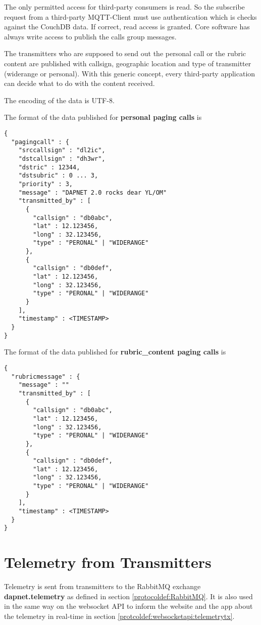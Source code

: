 The only permitted access for third-party consumers is read. So the subscribe request from a third-party MQTT-Client must use authentication which is checks against the CouchDB data. If correct, read access is granted. Core software has always write access to publish the calls group messages.

The transmitters who are supposed to send out the personal call or the rubric content are published with callsign, geographic location and type of transmitter (widerange or personal). With this generic concept, every third-party application can decide what to do with the content received.

The encoding of the data is UTF-8.

The format of the data published for \textbf{personal paging calls} is
\begin{lstlisting}
{
  "pagingcall" : {
    "srccallsign" : "dl2ic",
    "dstcallsign" : "dh3wr",
    "dstric" : 12344,
    "dstsubric" : 0 ... 3,
    "priority" : 3,
    "message" : "DAPNET 2.0 rocks dear YL/OM"
    "transmitted_by" : [
      {
        "callsign" : "db0abc",
        "lat" : 12.123456,
        "long" : 32.123456,
        "type" : "PERONAL" | "WIDERANGE"
      },
      {
        "callsign" : "db0def",
        "lat" : 12.123456,
        "long" : 32.123456,
        "type" : "PERONAL" | "WIDERANGE"
      }
    ],
    "timestamp" : <TIMESTAMP>
  }
}
\end{lstlisting}

The format of the data published for \textbf{rubric\_content paging calls} is
\begin{lstlisting}
{
  "rubricmessage" : {
    "message" : ""
    "transmitted_by" : [
      {
        "callsign" : "db0abc",
        "lat" : 12.123456,
        "long" : 32.123456,
        "type" : "PERONAL" | "WIDERANGE"
      },
      {
        "callsign" : "db0def",
        "lat" : 12.123456,
        "long" : 32.123456,
        "type" : "PERONAL" | "WIDERANGE"
      }
    ],
    "timestamp" : <TIMESTAMP>
  }
}
\end{lstlisting}

\section{Telemetry from Transmitters}
\label{protocoldef:telemetrytx}
Telemetry is sent from transmitters to the RabbitMQ exchange
\textbf{dapnet.telemetry} as defined in section \ref{protocoldef:RabbitMQ}. It
is also used in the same way on the websocket API to inform the website and the
app about the telemetry in real-time in section
\ref{protcoldef:websocketapi:telemetrytx}.


